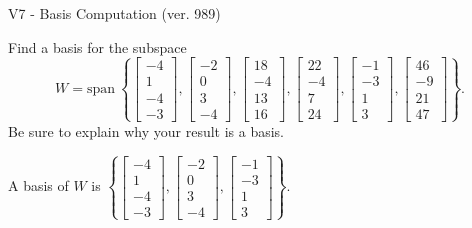 \begin{exercise}
  \begin{exerciseTitle}V7 - Basis Computation (ver. 989)\end{exerciseTitle}
  \begin{exerciseStatement}
    Find a basis for the subspace 
\[W=\mathrm{span}\ \left\{\left[\begin{array}{r}
-4 \\
1 \\
-4 \\
-3
\end{array}\right] , \left[\begin{array}{r}
-2 \\
0 \\
3 \\
-4
\end{array}\right] , \left[\begin{array}{r}
18 \\
-4 \\
13 \\
16
\end{array}\right] , \left[\begin{array}{r}
22 \\
-4 \\
7 \\
24
\end{array}\right] , \left[\begin{array}{r}
-1 \\
-3 \\
1 \\
3
\end{array}\right] , \left[\begin{array}{r}
46 \\
-9 \\
21 \\
47
\end{array}\right]\right\}.\]
 Be sure to explain why your result is a basis.


  \end{exerciseStatement}
  \begin{exerciseAnswer}
   A basis of \(W\) is  \(\left\{\left[\begin{array}{r}
-4 \\
1 \\
-4 \\
-3
\end{array}\right] , \left[\begin{array}{r}
-2 \\
0 \\
3 \\
-4
\end{array}\right] , \left[\begin{array}{r}
-1 \\
-3 \\
1 \\
3
\end{array}\right]\right\}\).
  


  \end{exerciseAnswer}
\end{exercise}